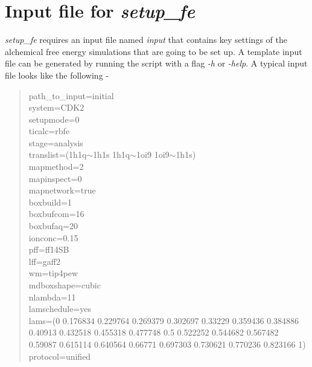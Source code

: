 \documentclass[11pt,letterpaper,titlepage]{article}
\newenvironment{itquote}
  {\begin{quote}\itshape}
  {\end{quote}\ignorespacesafterend}
\begin{document}
\vspace{0.1cm}
\section{Input file for \textit{setup\_fe}}
\vspace{0.1cm}

\textit{setup\_fe} requires an input file named \textit{input} that contains key settings of the
alchemical free energy simulations that are going to be set up. A template input file can be
generated by running the script with a flag \textit{-h} or \textit{-help}. A typical input file looks like the
following -

\vspace{1cm}
\begin{itquote}
	
{\color{blue}
	
path\_to\_input=initial 			\\
system=CDK2 					\\
setupmode=0                      		\\
ticalc=rbfe                      		\\
stage=analysis                   		\\
translist=(1h1q$\sim$1h1s 1h1q$\sim$1oi9 1oi9$\sim$1h1s) 	\\

mapmethod=2 					\\
mapinspect=0 					\\
mapnetwork=true 				\\

boxbuild=1 					\\
boxbufcom=16  		 			\\
boxbufaq=20		 			\\
ionconc=0.15		 			\\
pff=ff14SB					\\
lff=gaff2					\\
wm=tip4pew					\\
mdboxshape=cubic				\\

nlambda=11  					\\
lamschedule=yes					\\
lams=(0 0.176834 0.229764 0.269379 0.302697 0.33229 0.359436 0.384886 0.40913 0.432518 0.455318 0.477748 0.5 0.522252 0.544682 0.567482 0.59087 0.615114 0.640564 0.66771 0.697303 0.730621 0.770236 0.823166 1) \\
protocol=unified 				\\

}
\end{itquote}
\end{document}
